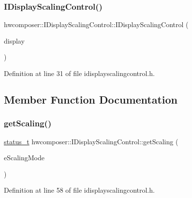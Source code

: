 \subsubsection{\texorpdfstring{I\+Display\+Scaling\+Control()}{IDisplayScalingControl()}}
{\footnotesize\ttfamily hwcomposer\+::\+I\+Display\+Scaling\+Control\+::\+I\+Display\+Scaling\+Control (\begin{DoxyParamCaption}\item[{uint32\+\_\+t}]{display }\end{DoxyParamCaption})\hspace{0.3cm}{\ttfamily [inline]}}



Definition at line 31 of file idisplayscalingcontrol.\+h.


\begin{DoxyCode}{0}
\end{DoxyCode}


\subsection{Member Function Documentation}
\mbox{\label{classhwcomposer_1_1IDisplayScalingControl_ae95df0ea1728944684b91a80d0d9d6d0}} 
\subsubsection{\texorpdfstring{get\+Scaling()}{getScaling()}}
{\footnotesize\ttfamily \mbox{\hyperlink{hwcserviceapi_8h_a3806fb2027d9a316d8ca8d9b8b8eb96f}{status\+\_\+t}} hwcomposer\+::\+I\+Display\+Scaling\+Control\+::get\+Scaling (\begin{DoxyParamCaption}\item[{\mbox{\hyperlink{classhwcomposer_1_1IDisplayScalingControl_a96b7ad3bec70da200ece1cd815807aab}{E\+Scaling\+Mode}} $\ast$}]{e\+Scaling\+Mode }\end{DoxyParamCaption})\hspace{0.3cm}{\ttfamily [inline]}}



Definition at line 58 of file idisplayscalingcontrol.\+h.


